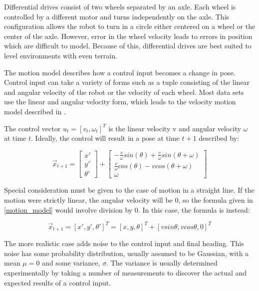 \documentclass[12pt]{article}
\begin{document}
Differential drives consist of two wheels separated by an axle.  Each wheel is controlled by a different motor and turns independently on the axle.  This configuration allows the robot to turn in a circle either centered on a wheel or the center of the axle.  However, error in the wheel velocity leads to errors in position which are difficult to model.  Because of this, differential drives are best suited to level environments with even terrain.  

The motion model describes how a control input becomes a change in pose.  Control input can take a variety of forms such as a tuple consisting of the linear and angular velocity of the robot or the velocity of each wheel.  Most data sets \cite{Radish} use the linear and angular velocity form, which leads to the velocity motion model described in \cite{ThrunPR2005}.

The control vector $u_{t} =[v_{t}, \omega_{t}]^T$ is the linear velocity v and angular velocity $\omega$ at time $t$.  Ideally, the control will result in a pose at time $t+1$ described by:

\begin{equation}\label{motion_model}
\vec{x}_{t+1}=
\left[ {\begin{array}{cc}
 x' \\
 y' \\
\theta'
\end{array} } \right] +
\left[ {\begin{array}{cc}
 -\frac{v}{\omega} sin(\theta)+\frac{v}{\omega} sin(\theta + \omega) \\
 \frac{v}{\omega} cos(\theta)-v cos(\theta + \omega)  \\
\omega
\end{array} } \right] 
\end{equation}


Special consideration must be given to the case of motion in a straight line.  If the motion were strictly linear, the angular velocity will be 0, so the formula given in \ref{motion_model} would involve division by 0.  In this case, the formula is instead:

\begin{equation}\label{motion_model2}
\vec{x}_{t+1}=[x', y', \theta']^T=[x, y, \theta]^T + [v sin\theta , v cos\theta, 0]^T 
\end{equation}

The more realistic case adds noise to the control input and final heading.  This noise has some probability distribution, usually assumed to be Gaussian, with a mean $\mu=0$ and some variance, $\sigma$.  The variance is usually determined experimentally by taking a number of measurements to discover the actual and expected results of a control input.
\end{document}
